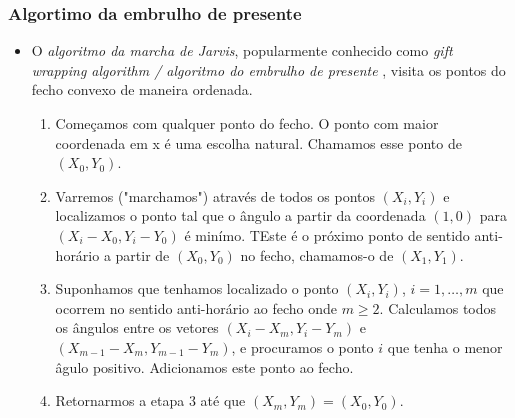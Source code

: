 \documentclass[12pt]{article}
\begin{document}
\bigskip
\subsubsection{Algortimo da embrulho de presente}

\begin{itemize}

\item O {\em algoritmo da marcha de Jarvis}, popularmente conhecido como {\em gift
wrapping algorithm / algoritmo do embrulho de presente} , visita os pontos do fecho convexo de maneira ordenada.

\begin{enumerate}

\item Começamos com qualquer ponto do fecho. O ponto com maior coordenada em x é uma escolha natural. Chamamos esse ponto de $(X_0, Y_0)$.

\item Varremos ("marchamos") através de todos os pontos $(X_i, Y_i)$ e localizamos o ponto tal que o ângulo a partir da coordenada $(1,0)$ para $(X_i - X_0, Y_i - Y_0)$ é minímo.
TEste é o próximo ponto de sentido anti-horário a partir de $(X_0,Y_0)$ no fecho, chamamos-o de $(X_1, Y_1)$.

\item Suponhamos que tenhamos localizado o ponto $(X_i,Y_i)$, $i=1, \ldots, m$ que ocorrem no sentido anti-horário ao fecho onde $m \ge 2$.
Calculamos todos os ângulos entre os vetores $(X_i - X_m, Y_i - Y_m)$ e
$(X_{m-1} - X_m, Y_{m-1} - Y_m)$, e procuramos o ponto $i$ que tenha o menor âgulo positivo.  Adicionamos este ponto ao fecho.

\item Retornarmos a etapa 3 até que $(X_m,Y_m) = (X_0,Y_0)$.

\end{enumerate}

\begin{center}
\end{center}


\end{itemize}
\end{document}
